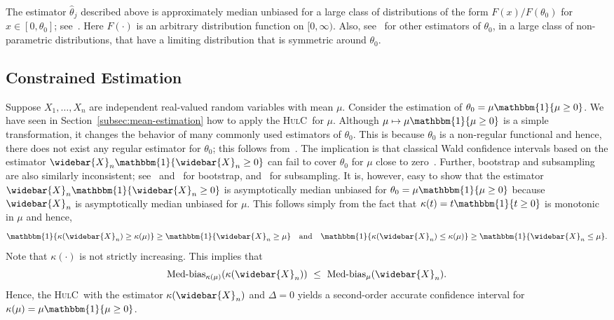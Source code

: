\documentclass{article}
\newcommand{\hulc}{\textsc{HulC}~}
\numberwithin{myalgctr}{section}
\begin{document}
The estimator $\widehat{\theta}_j$ described above is approximately median unbiased for a large class of distributions of the form $F(x)/F(\theta_0)$ for $x\in[0,\theta_0]$; see~\citet[Section 3]{robson1964estimation}. {\color{black}Here $F(\cdot)$ is an arbitrary distribution function on $[0, \infty)$.} Also, see~\cite{hall1982estimating} for other estimators of $\theta_0$, in a large class of non-parametric distributions, that have a limiting distribution that is symmetric around $\theta_0$.
\subsection{Constrained Estimation}\label{subsec:constrained-estimation}
Suppose $X_1, \ldots, X_n$ are independent real-valued random variables with mean $\mu$. Consider the estimation of $\theta_0 = \mu\mathbbm{1}\{\mu \ge 0\}$. We have seen in Section~\ref{subsec:mean-estimation} how to apply the \hulc for $\mu$. Although $\mu\mapsto\mu\mathbbm{1}\{\mu\ge0\}$ is a simple transformation, it changes the behavior of many commonly used estimators of $\theta_0$. This is because $\theta_0$ is a non-regular functional and hence, there does not exist any regular estimator for $\theta_0$; this follows from~\citet[Theorem 2]{hirano2012impossibility}. The implication is that classical Wald confidence intervals based on the estimator $\widebar{X}_n\mathbbm{1}\{\widebar{X}_n \ge 0\}$ can fail to cover $\theta_0$ for $\mu$ close to zero~\citep[Appendix 1.1]{robins2004optimal}. Further, bootstrap and subsampling are also similarly inconsistent; see~\citet[Section 3.2]{fang2019inference} and~\citet[Section 3]{andrews2000inconsistency} for bootstrap, and~\citet[Eq. (1)--(2)]{andrews2010asymptotic} for subsampling. It is, however, easy to show that the estimator $\widebar{X}_n\mathbbm{1}\{\widebar{X}_n \ge 0\}$ is asymptotically median unbiased for $\theta_0 = \mu\mathbbm{1}\{\mu\ge0\}$ because $\widebar{X}_n$ is asymptotically median unbiased for $\mu$. This follows simply from the fact that $\kappa(t) = t\mathbbm{1}\{t \ge 0\}$ is monotonic in $\mu$ and hence,
\begin{equation}\label{eq:determinisitc-inequality-constrained}
\mathbbm{1}\{\kappa(\widebar{X}_n) \ge \kappa(\mu)\} \ge \mathbbm{1}\{\widebar{X}_n \ge \mu\}\quad\mbox{and}\quad \mathbbm{1}\{\kappa(\widebar{X}_n) \le \kappa(\mu)\} \ge \mathbbm{1}\{\widebar{X}_n \le \mu\}.
\end{equation}
Note that $\kappa(\cdot)$ is not strictly increasing. This implies that
\begin{equation}\label{eq:probabilistic-inequality-constrained}
\mbox{Med-bias}_{\kappa(\mu)}(\kappa(\widebar{X}_n)) ~\le~ \mbox{Med-bias}_{\mu}(\widebar{X}_n).
\end{equation}
Hence, the \hulc with the estimator $\kappa(\widebar{X}_n)$ and $\Delta = 0$ yields a second-order accurate confidence interval for $\kappa(\mu)=\mu\mathbbm{1}\{\mu\ge0\}$. 
\end{document}
